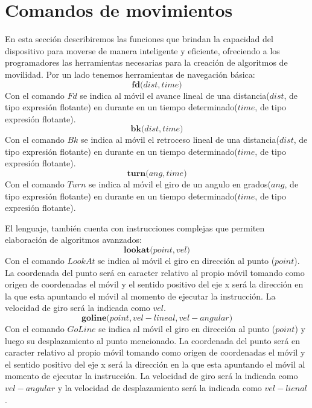 \documentclass[11pt]{scrartcl}
\begin{document}
\section{Comandos de movimientos}
En esta secci\'on describiremos las funciones que brindan la capacidad
 del dispositivo para moverse de manera inteligente y eficiente, 
 ofreciendo a los programadores las herramientas necesarias para la 
 creación de algoritmos de movilidad. Por un lado tenemos herramientas de 
 navegaci\'on b\'asica:
\begin{equation*}
\textbf{fd(} dist , time \textbf{)}
\end{equation*}
Con el comando $Fd$ se indica al m\'ovil el avance lineal de una distancia($dist$, de tipo expresi\'on flotante) en durante en un tiempo determinado($time$, de tipo expresi\'on flotante).
\begin{equation*}
\textbf{bk(} dist , time \textbf{)}
\end{equation*}
Con el comando $Bk$ se indica al m\'ovil el retroceso lineal de una distancia($dist$, de tipo expresi\'on flotante) en durante en un tiempo determinado($time$, de tipo expresi\'on flotante).
\begin{equation*}
\textbf{turn(} ang , time \textbf{)}
\end{equation*}
Con el comando $Turn$ se indica al m\'ovil el giro de un angulo en grados($ang$, de tipo expresi\'on flotante) en durante en un tiempo determinado($time$, de tipo expresi\'on flotante).

\bigskip
El lenguaje, tambi\'en cuenta con instrucciones complejas que permiten elaboraci\'on de algoritmos avanzados:
\begin{equation*}
\textbf{lookat(}point, vel\textbf{)}
\end{equation*}
Con el comando $LookAt$ se indica al m\'ovil el giro en direcci\'on al 
punto ($point$). La coordenada del punto ser\'a en  caracter relativo al propio m\'ovil 
tomando como origen de coordenadas el  m\'ovil y el sentido positivo del eje x ser\'a 
la direcci\'on en la que esta apuntando el m\'ovil al momento de ejecutar la instrucci\'on.
La velocidad de giro ser\'a la indicada como $vel$.
\begin{equation*}
\textbf{goline(}point , vel-lineal , vel-angular \textbf{)}
\end{equation*}
Con el comando $GoLine$ se indica al m\'ovil el giro en direcci\'on al 
punto ($point$) y luego su desplazamiento al punto mencionado. La coordenada 
del punto ser\'a en  caracter relativo al propio m\'ovil 
tomando como origen de coordenadas el  m\'ovil y el sentido positivo del eje x ser\'a 
la direcci\'on en la que esta apuntando el m\'ovil al momento de ejecutar la instrucci\'on.
La velocidad de giro ser\'a la indicada como $vel-angular$ y la velocidad de desplazamiento
ser\'a la indicada como $vel-lienal$.
\end{document}
